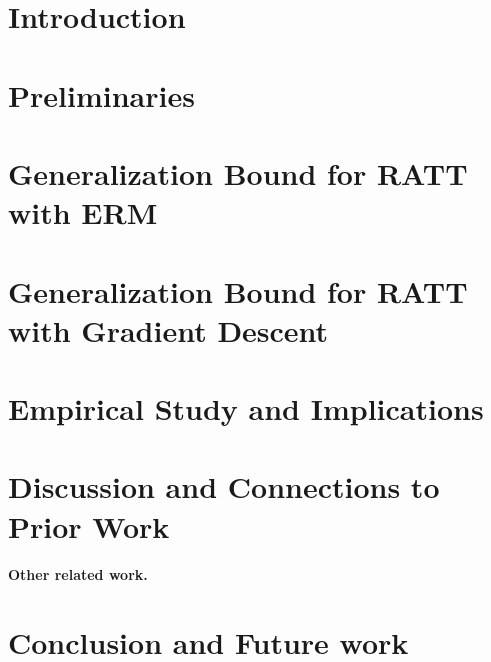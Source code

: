 \documentclass{article}
\begin{document}
\begin{abstract}

\end{abstract}

\section{Introduction} \label{sec:intro}


\section{Preliminaries} \label{sec:setup}


\section{Generalization Bound for RATT with ERM}
\label{sec:ERM_training}


\section{Generalization Bound for RATT with Gradient Descent}
\label{sec:linear_models}



\section{Empirical Study and Implications} \label{sec:exp}


\section{Discussion and Connections to Prior Work}\label{sec:discuss}



\textbf{Other related work.} %



\section{Conclusion and Future work} \label{sec:conc}

\end{document}
